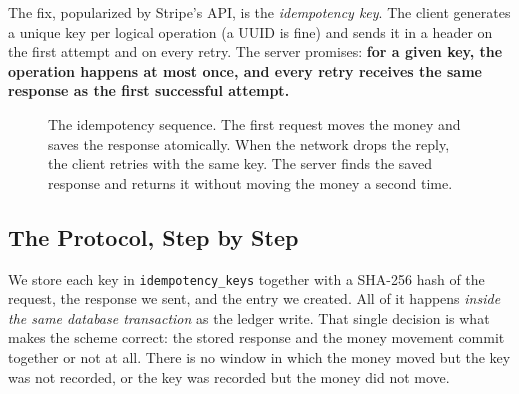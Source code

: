 The fix, popularized by Stripe's API, is the \emph{idempotency key}. The client generates a unique key per logical operation (a UUID is fine) and sends it in a header on the first attempt and on every retry. The server promises: \textbf{for a given key, the operation happens at most once, and every retry receives the same response as the first successful attempt.}

\begin{figure}[htbp]
\centering
{}
\caption{The idempotency sequence. The first request moves the money and saves the response atomically. When the network drops the reply, the client retries with the same key. The server finds the saved response and returns it without moving the money a second time.}
\label{ch14:fig-idempotency}
\end{figure}

\subsection{The Protocol, Step by Step}

We store each key in \texttt{idempotency\_keys} together with a SHA-256 hash of the request, the response we sent, and the entry we created. All of it happens \emph{inside the same database transaction} as the ledger write. That single decision is what makes the scheme correct: the stored response and the money movement commit together or not at all. There is no window in which the money moved but the key was not recorded, or the key was recorded but the money did not move.

